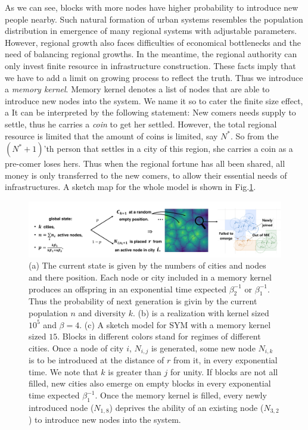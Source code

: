 \documentclass[reprint,unsortedaddress,amsmath,amssymb,aps,prl,showkeys]{revtex4-2}
\begin{document}
As we can see, blocks with more nodes have higher probability to introduce new people nearby. Such natural formation of urban systems resembles the population distribution in emergence of many regional systems with adjustable parameters. However, regional growth also faces difficulties of economical bottlenecks and the need of balancing regional growths. In the meantime, the regional authority can only invest finite resource in infrastructure construction. These facts imply that we have to add a limit on growing process to reflect the truth. Thus we introduce a \emph{memory kernel}. Memory kernel denotes a list of nodes that are able to introduce new nodes into the system. We name it so to cater the finite size effect, a  It can be interpreted by the following statement: New comers needs supply to settle, thus he carries a \emph{coin} to get her settled. However, the total regional resource is limited that the amount of coins is limited, say $N^*$. So from the $(N^*+1)$'th person that settles in a city of this region, she carries a coin as a pre-comer loses hers. Thus when the regional fortune has all been shared, all money is only transferred to the new comers, to allow their essential needs of infrastructures. A sketch map for the whole model is shown in Fig.\@\ref{sketchpic}.

\begin{figure}
    \centering
    \includegraphics[width = 0.95\linewidth]{pics/sketch}
    \caption{(a) The current state is given by the numbers of cities and nodes and there position. Each node or city included in a memory kernel produces an offspring in an exponential time expected $\beta_2^{-1}$ or $\beta_1^{-1}$. Thus the probability of next generation is givin by the current population $n$ and diversity $k$. (b) is a realization with kernel sized $10^5$ and $\beta = 4$. (c) A sketch model for SYM with a memory kernel sized $15$. Blocks in different colors stand for regimes of different cities. Once a node of city $i$, $N_{i,j}$ is generated, some new node $N_{i,k}$ is to be introduced at the distance of $r$ from it, in every exponential time. We note that $k$ is greater than $j$ for unity. If blocks are not all filled, new cities also emerge on empty blocks in every exponential time expected $\beta_1^{-1}$. Once the memory kernel is filled, every newly introduced node ($N_{1,8}$) deprives the ability of an existing node ($N_{3,2}$) to introduce new nodes into the system.}
    \label{sketchpic}
\end{figure}
\end{document}
